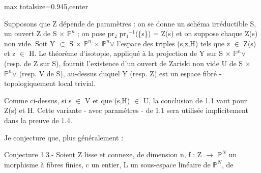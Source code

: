 \documentclass[10pt,a4paper]{article}
\begin{document}
\begin{adjustbox}{max totalsize={\textwidth}{0.945\textheight},center}
\begin{minipage}{\textwidth}
\noindent Supposons que Z dépende de paramètres : on se donne un schéma irréductible S, un ouvert Z de S \ensuremath{×} \ensuremath{ℙ^n} ; on pose pr\ensuremath{₂} pr\ensuremath{₁^{-1}}(\{s\}) = Z(s) et on suppose chaque Z(s) non vide. Soit Y \ensuremath{⊂} S \ensuremath{×} \ensuremath{ℙ^n} \ensuremath{×} \ensuremath{ℙ^n}\ensuremath{∨} l'espace des triples (s,z,H) tels que z \ensuremath{∈} Z(s) et z \ensuremath{∈} H. Le théorème d'isotopie, appliqué à la projection de Y sur S \ensuremath{×} \ensuremath{ℙ^n}\ensuremath{∨} (resp. de Z sur S), fournit l'existence d'un ouvert de Zariski non vide U de S \ensuremath{×} \ensuremath{ℙ^n}\ensuremath{∨} (resp. V de S), au-dessus duquel Y (resp. Z) est un espace fibré - topologiquement local trivial.\par\smallskip
\noindent Comme ci-dessus, si s \ensuremath{∈} V et que (s,H) \ensuremath{∈} U, la conclusion de 1.1 vaut pour Z(s) et H. Cette variante - avec paramètres - de 1.1 sera utilisée implicitement dans la preuve de 1.4.\par\smallskip
\noindent Je conjecture que, plus généralement :\par\smallskip
\noindent Conjecture 1.3.- Soient Z lisse et connexe, de dimension n, f : Z \ensuremath{→} \ensuremath{ℙ^N} un morphisme à fibres finies, c un entier, L un sous-espace linéaire de \ensuremath{ℙ^N}, de\par\smallskip
\end{minipage}
\end{adjustbox}
\newpage
\end{document}
